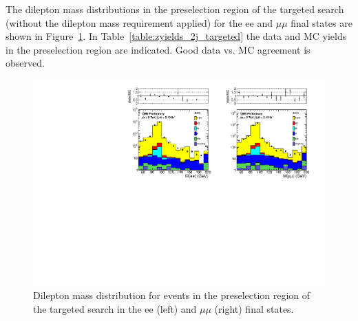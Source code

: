 The dilepton mass distributions in the preselection region of the targeted search (without the dilepton mass requirement applied) 
for the ee and $\mu\mu$ final states are shown in Figure~\ref{fig:dilmass_2j_targeted}. In Table~\ref{table:zyields_2j_targeted} 
the data and MC yields in the preselection region are indicated. Good data vs. MC agreement is observed.

\begin{figure}[hbt]
  \begin{center}
	\includegraphics[width=1.0\linewidth]{plots/dilmass_ee_mm_2j_targeted.pdf}
	\caption{
	  \label{fig:dilmass_2j_targeted}\protect 
	  Dilepton mass distribution for events in the preselection region of the targeted search
	  in the ee (left) and $\mu\mu$ (right) final states.}
  \end{center}
\end{figure}

